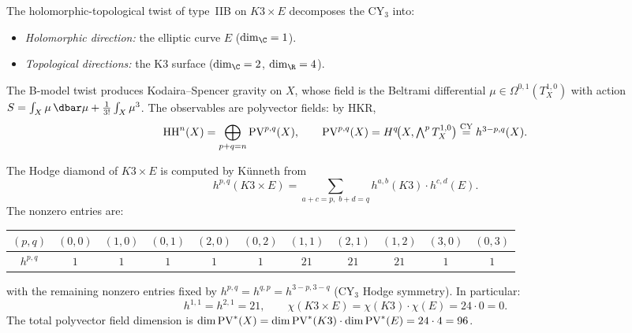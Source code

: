 The holomorphic-topological twist of type~IIB on $K3 \times E$
decomposes the CY$_3$ into:
\begin{itemize}
\item \emph{Holomorphic direction:} the elliptic curve $E$
 ($\dim_\C = 1$).
\item \emph{Topological directions:} the K3 surface
 ($\dim_\C = 2$, $\dim_\R = 4$).
\end{itemize}
The B-model twist produces Kodaira--Spencer gravity on $X$, whose
field is the Beltrami differential
$\mu \in \Omega^{0,1}(T^{1,0}_X)$ with action
$S = \int_X \mu \,\dbar\mu + \tfrac{1}{3!}\int_X \mu^3$.
The observables are polyvector fields: by HKR,
\begin{equation}\label{eq:k3e-hh-hkr}
\operatorname{HH}^n(X) = \bigoplus_{p+q=n} \operatorname{PV}^{p,q}(X),
\qquad
\operatorname{PV}^{p,q}(X) = H^q\!\bigl(X, \textstyle\bigwedge^p T^{1,0}_X\bigr)
\overset{\text{CY}}{=} h^{3-p,q}(X).
\end{equation}

The Hodge diamond of $K3 \times E$ is computed by K\"unneth from
\begin{equation}\label{eq:k3e-hodge-kunneth}
h^{p,q}(K3 \times E) = \sum_{a+c=p,\; b+d=q}
h^{a,b}(K3) \cdot h^{c,d}(E).
\end{equation}
The nonzero entries are:
\begin{center}
\renewcommand{\arraystretch}{1.2}
\small
\begin{tabular}{c|cccccccccc}
$(p,q)$ & $(0,0)$ & $(1,0)$ & $(0,1)$ & $(2,0)$ & $(0,2)$ & $(1,1)$ & $(2,1)$ & $(1,2)$
 & $(3,0)$ & $(0,3)$ \\
\hline
$h^{p,q}$ & $1$ & $1$ & $1$ & $1$ & $1$ & $21$ & $21$ & $21$ & $1$ & $1$
\end{tabular}
\end{center}
with the remaining nonzero entries fixed by $h^{p,q} = h^{q,p}
= h^{3-p,3-q}$ (CY$_3$ Hodge symmetry). In particular:
\begin{equation}\label{eq:k3e-hodge-key}
h^{1,1} = h^{2,1} = 21, \qquad
\chi(K3 \times E) = \chi(K3)\cdot\chi(E) = 24 \cdot 0 = 0.
\end{equation}
The total polyvector field dimension is
$\dim \operatorname{PV}^*(X) = \dim \operatorname{PV}^*(K3) \cdot \dim \operatorname{PV}^*(E)
= 24 \cdot 4 = 96$.

